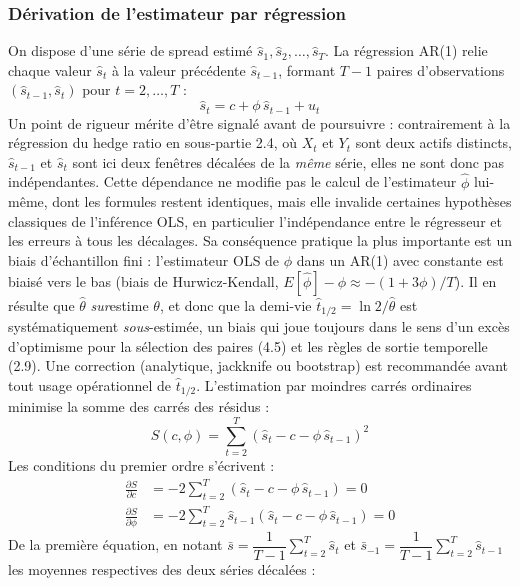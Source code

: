 \documentclass{article}
\begin{document}
\subsubsection*{Dérivation de l'estimateur par régression}
On dispose d'une série de spread estimé $\hat{s}_1, \hat{s}_2, \dots, \hat{s}_T$. La régression AR(1) relie chaque valeur $\hat{s}_t$ à la valeur précédente $\hat{s}_{t-1}$, formant $T-1$ paires d'observations $(\hat{s}_{t-1}, \hat{s}_t)$ pour $t = 2, \dots, T$ :
\begin{equation}
\hat{s}_t = c + \phi\, \hat{s}_{t-1} + u_t
\end{equation}
Un point de rigueur mérite d'être signalé avant de poursuivre : contrairement à la régression du hedge ratio en sous-partie 2.4, où $X_t$ et $Y_t$ sont deux actifs distincts, $\hat{s}_{t-1}$ et $\hat{s}_t$ sont ici deux fenêtres décalées de la \emph{même} série, elles ne sont donc pas indépendantes. Cette dépendance ne modifie pas le calcul de l'estimateur $\hat\phi$ lui-même, dont les formules restent identiques, mais elle invalide certaines hypothèses classiques de l'inférence OLS, en particulier l'indépendance entre le régresseur et les erreurs à tous les décalages. Sa conséquence pratique la plus importante est un biais d'échantillon fini : l'estimateur OLS de $\phi$ dans un AR(1) avec constante est biaisé vers le bas (biais de Hurwicz-Kendall, $E[\hat\phi]-\phi\approx -(1+3\phi)/T$). Il en résulte que $\hat\theta$ \emph{sur}estime $\theta$, et donc que la demi-vie $\hat t_{1/2}=\ln 2/\hat\theta$ est systématiquement \emph{sous}-estimée, un biais qui joue toujours dans le sens d'un excès d'optimisme pour la sélection des paires (4.5) et les règles de sortie temporelle (2.9). Une correction (analytique, jackknife ou bootstrap) est recommandée avant tout usage opérationnel de $\hat t_{1/2}$.
L'estimation par moindres carrés ordinaires minimise la somme des carrés des résidus :
\begin{equation}
S(c, \phi) = \sum_{t=2}^{T} \left(\hat{s}_t - c - \phi\, \hat{s}_{t-1}\right)^2
\end{equation}
Les conditions du premier ordre s'écrivent :
\begin{align}
\frac{\partial S}{\partial c} &= -2\sum_{t=2}^{T} \left(\hat{s}_t - c - \phi\, \hat{s}_{t-1}\right) = 0 \\
\frac{\partial S}{\partial \phi} &= -2\sum_{t=2}^{T} \hat{s}_{t-1}\left(\hat{s}_t - c - \phi\, \hat{s}_{t-1}\right) = 0
\end{align}
De la première équation, en notant $\bar{s} = \dfrac{1}{T-1}\displaystyle\sum_{t=2}^{T} \hat{s}_t$ et $\bar{s}_{-1} = \dfrac{1}{T-1}\displaystyle\sum_{t=2}^{T} \hat{s}_{t-1}$ les moyennes respectives des deux séries décalées :
\end{document}
